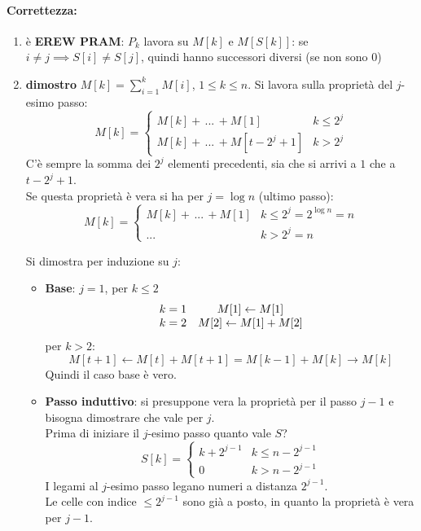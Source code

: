 \paragraph{Correttezza:}
\begin{enumerate}
	\item è \textbf{EREW PRAM}: $P_k$ lavora su $M[k]$ e $M[S[k]]$: se $i \neq j \implies S[i] \neq S[j]$, quindi hanno successori diversi (se non sono 0)
	\item \textbf{dimostro} $M[k] = \sum_{i=1}^k M[i]$, $1 \leq k \leq n$. Si lavora sulla proprietà del $j$-esimo passo:
	$$ M[k] = \begin{cases}
		M[k] + \, ... \, + M[1] & k \leq 2^j \\
		M[k] + \, ... \, + M[t- 2^j + 1] & k > 2^j
	\end{cases}
	$$
	C'è sempre la somma dei $2^j$ elementi precedenti, sia che si arrivi a $1$ che a $t-2^j+1$. \\
	Se questa proprietà è vera si ha per $j=\log n$ (ultimo passo):
	$$ M[k] = \begin{cases}
		M[k] + \, ... \, + M[1] & k \leq 2^j = 2^{\log n} = n \\
		... & k>2^j = n
	\end{cases}
	$$
	
	Si dimostra per induzione su $j$:
	\begin{itemize}
		\item \textbf{Base}: $j=1$, per $k \leq 2$
		$$ 
		\begin{array}{c c}
			k = 1 & M[1] \leftarrow M[1]  \\
			k = 2 & M[2] \leftarrow M[1] + M[2]
		\end{array}
		$$
		per $k > 2$:
		$$ 
		M[t + 1] \leftarrow M[t] + M[t+1] = M[k-1] + M[k] \rightarrow M[k]
		$$
		Quindi il caso base è vero.\\
		
		
		\newpage
		
		\item \textbf{Passo induttivo}: si presuppone vera la proprietà per il passo $j-1$ e bisogna dimostrare che vale per $j$. \\
		Prima di iniziare il $j$-esimo passo quanto vale $S$?
		$$ S[k] = \begin{cases}
			k + 2^{j-1} & k \leq n-2^{j-1} \\
			0 & k > n - 2^{j-1}
		\end{cases}$$
		I legami al $j$-esimo passo legano numeri a distanza $2^{j-1}$.\\
		Le celle con indice $\leq 2^{j-1}$ sono già a posto, in quanto la proprietà è vera per $j-1$.\\
		

\end{itemize}
\end{enumerate}
